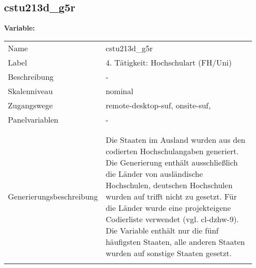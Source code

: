 	
	
	\subsection{cstu213d\_g5r}
	\label{subSection:cstu213d_g5r}

	\noindent\textbf{Variable:}\\
		\begin{tabular}{lL{11.3cm}}
			\label{tableVariable:cstu213d_g5r}
			Name & cstu213d\_g5r \\
			Label & 4. Tätigkeit: Hochschulart (FH/Uni) \\
			Beschreibung & - \\
			Skalenniveau & nominal \\
			Zugangswege &
				remote-desktop-suf,
				onsite-suf,
 \\
			Panelvariablen & -
			 \\
			 \\
 \\
					Generierungsbeschreibung & Die Staaten im Ausland wurden aus den codierten Hochschulangaben generiert. Die Generierung enthält ausschließlich die Länder von ausländische Hochschulen, deutschen Hochschulen wurden auf trifft nicht zu gesetzt. Für die Länder wurde eine projekteigene Codierliste verwendet (vgl. cl-dzhw-9). Die Variable enthält nur die fünf häufigsten Staaten, alle anderen Staaten wurden auf sonstige Staaten gesetzt. 
				 \\	
			 \\
		\end{tabular}






